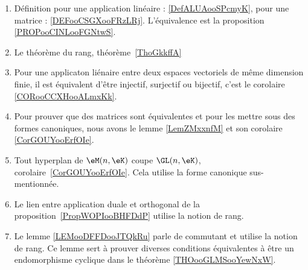     \begin{enumerate}
        \item Définition pour une application linéaire : \ref{DefALUAooSPcmyK}, pour une matrice : \ref{DEFooCSGXooFRzLRj}. L'équivalence est la proposition \ref{PROPooCINLooFGNtwS}.
        \item Le théorème du rang, théorème~\ref{ThoGkkffA}
        \item Pour une applicaton liénaire entre deux espaces vectoriels de même dimension finie, il est équivalent d'être injectif, surjectif ou bijectif, c'est le corolaire \ref{CORooCCXHooALmxKk}.
        \item Pour prouver que des matrices sont équivalentes et pour les mettre sous des formes canoniques, nous avons le lemme \ref{LemZMxxnfM} et son corolaire \ref{CorGOUYooErfOIe}.
        \item Tout hyperplan de \( \eM(n,\eK)\) coupe \( \GL(n,\eK)\), corolaire~\ref{CorGOUYooErfOIe}. Cela utilise la forme canonique sus-mentionnée.
        \item Le lien entre application duale et orthogonal de la proposition~\ref{PropWOPIooBHFDdP} utilise la notion de rang.
        \item Le lemme \ref{LEMooDFFDooJTQkRu} parle de commutant et utilise la notion de rang. Ce lemme sert à prouver diverses conditions équivalentes à être un endomorphisme cyclique dans le théorème \ref{THOooGLMSooYewNxW}.
        \end{enumerate}


